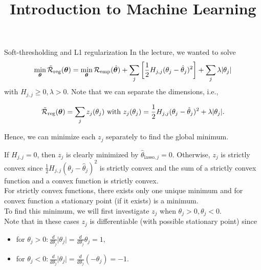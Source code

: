 \documentclass[11pt,compress,t,notes=noshow, xcolor=table]{beamer}
\title{Introduction to Machine Learning}
\begin{document}




\begin{vbframe}{Soft-thresholding and L1 regularization}
In the lecture, we wanted to solve
     \[
      \min_{\bm{\theta}} \mathcal{\tilde R}_{\text{reg}}(\bm{\theta}) =  \min_{\bm{\theta}}\mathcal{R}_{\text{emp}}(\hat{\bm{\theta}}) + \sum_j \left[ \frac{1}{2} H_{j,j} (\theta_j - \hat{\theta}_j)^2 \right] + \sum_j \lambda |\theta_j|
      \]
with $H_{j,j} \geq 0, \lambda > 0$. Note that we can separate the dimensions, i.e.,

\[\mathcal{\tilde R}_{\text{reg}}(\bm{\theta}) = \sum_j z_j(\theta_j) \text{ with } z_j(\theta_j) = \frac{1}{2} H_{j,j} (\theta_j - \hat{\theta}_j)^2 + \lambda |\theta_j|.\]
      
Hence, we can minimize each $z_j$ separately to find the global minimum. \\
\lz

If $H_{j,j} = 0$, then $z_j$ is clearly minimized by $\hat{\theta}_{\text{lasso},j} = 0.$ Otherwise, $z_j$ is strictly convex since $\frac{1}{2} H_{j,j} (\theta_j - \hat{\theta}_j)^2$ is strictly convex and the sum of a strictly convex function and a convex function is strictly convex. \\


\framebreak
For strictly convex functions, there exists only one unique minimum and for convex function a stationary point (if it exists) is a minimum. \\
\lz 
To find this minimum, we will first investigate $z_j$ when $\theta_j > 0, \theta_j < 0.$\\
\lz
Note that in these cases $z_j$ is differentiable (with possible stationary point) since
\begin{itemize}
    \item for $\theta_j > 0: \frac{d}{d\theta_j}\vert \theta_j\vert = \frac{d}{d\theta_j}\theta_j = 1,$
    \item for $\theta_j < 0: \frac{d}{d\theta_j}\vert \theta_j\vert = \frac{d}{d\theta_j}\left(-\theta_j\right) = -1$.
\end{itemize}


\end{vbframe}
\end{document}

